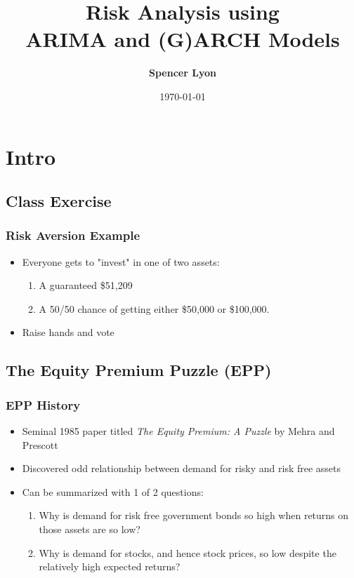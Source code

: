 \documentclass[11pt]{beamer}
\title[Risky Time Series]{Risk Analysis using \\ARIMA and (G)ARCH Models}
\author[Lyon]{\textbf{Spencer Lyon}}
\date{\today}
\theoremstyle{definition}
\begin{document}
\frame{\titlepage}

\section{Intro}

\subsection{Class Exercise}

  \begin{frame}
    \frametitle{Risk Aversion Example}
    \begin{itemize}[<+->]
      \item Everyone gets to "invest" in one of two assets:
      \begin{enumerate}
        \item A guaranteed \$51,209
        \item A 50/50 chance of getting either \$50,000 or \$100,000.
      \end{enumerate}
      \item Raise hands and vote
    \end{itemize}
  \end{frame}

\subsection{The Equity Premium Puzzle (EPP)}

  \begin{frame}
    \frametitle{EPP History}
    \begin{itemize}[<+->]
      \item Seminal 1985 paper titled \textit{The Equity Premium: A Puzzle} by Mehra and Prescott
      \item Discovered odd relationship between demand for risky and risk free assets
      \item Can be summarized with 1 of 2 questions:
      \begin{enumerate}
        \item Why is demand for risk free government bonds so high when returns on those assets are so low?
        \item Why is demand for stocks, and hence stock prices, so low despite the relatively high expected returns?
      \end{enumerate}
    \end{itemize}
  \end{frame}
\end{document}
